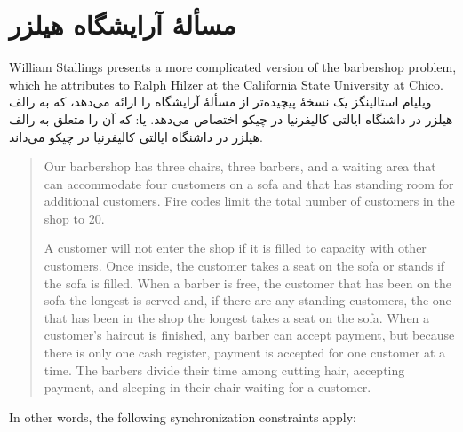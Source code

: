 \documentclass{book}
\newcommand{\clearemptydoublepage}{\newpage\cleardoublepage}
\begin{document}
\clearemptydoublepage
\section {مسألهٔ آرایشگاه هیلزر}

William Stallings \cite{stallings} presents a more complicated version
of the barbershop problem, which he attributes to Ralph Hilzer at the
California State University at Chico.
	ویلیام استالینگز \cite{stallings}  یک نسخهٔ پیچیده‌تر از مسألهٔ آرایشگاه را ارائه می‌دهد، 
	که به رالف هیلزر در داشنگاه ایالتی کالیفرنیا در چیکو اختصاص می‌دهد.
	یا: که آن را متعلق به رالف هیلزر در داشنگاه ایالتی کالیفرنیا در چیکو می‌داند.

\begin{quotation}
Our barbershop has three chairs, three barbers, and a waiting
area that can accommodate four customers on a sofa and that has
standing room for additional customers.  Fire codes limit the
total number of customers in the shop to 20.

A customer will not enter the shop if it is filled to capacity with
other customers.  Once inside, the customer takes a seat on the sofa
or stands if the sofa is filled.  When a barber is free, the customer
that has been on the sofa the longest is served and, if there are any
standing customers, the one that has been in the shop the longest
takes a seat on the sofa.  When a customer's haircut is finished, any
barber can accept payment, but because there is only one cash
register, payment is accepted for one customer at a time.  The barbers
divide their time among cutting hair, accepting payment, and sleeping
in their chair waiting for a customer.
\end{quotation}


In other words, the following synchronization constraints apply:
\end{document}
